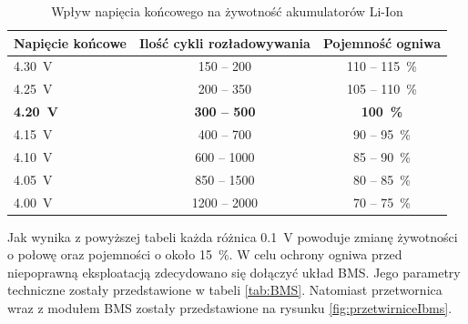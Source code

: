 		\begin{table}[ht]
			\centering
			\begin{tabular}{|l|c|c|} \hline
				\textbf{Napięcie końcowe} & \textbf{Ilość cykli rozładowywania} & \textbf{Pojemność ogniwa} \\
				\hline
				\hline \SI{4.30}{\volt} & 150 -- 200 & 110 -- \SI{115}{\percent}\\
				\hline \SI{4.25}{\volt}	& 200 -- 350 & 105 -- \SI{110}{\percent}\\
				\hline \textbf{\SI[detect-weight]{4.20}{\volt}} & \textbf{300 -- 500} & \textbf{\SI[detect-weight]{100}{\percent}}\\
				\hline \SI{4.15}{\volt}	& 400 -- 700 & 90 -- \SI{95}{\percent} \\
				\hline \SI{4.10}{\volt}	& 600 -- 1000 & 85 -- \SI{90}{\percent}\\
				\hline \SI{4.05}{\volt} & 850 -- 1500 & 80 -- \SI{85}{\percent}\\
				\hline \SI{4.00}{\volt} & 1200 -- 2000 & 70 -- \SI{75}{\percent}\\
				\hline
			\end{tabular}
			\caption{Wpływ napięcia końcowego na żywotność akumulatorów Li-Ion}
			\label{tab:napięcieKońcoweLiIon}
		\end{table}
	
	    Jak wynika z powyższej tabeli każda różnica \SI{0.1}{\volt} powoduje zmianę żywotności o połowę oraz pojemności o około \SI{15}{\percent}. W celu ochrony ogniwa przed niepoprawną eksploatacją zdecydowano się dołączyć układ BMS. Jego parametry techniczne zostały przedstawione w tabeli \ref{tab:BMS}. Natomiast przetwornica wraz z modułem BMS zostały przedstawione na rysunku \ref{fig:przetwirniceIbms}.
	    
